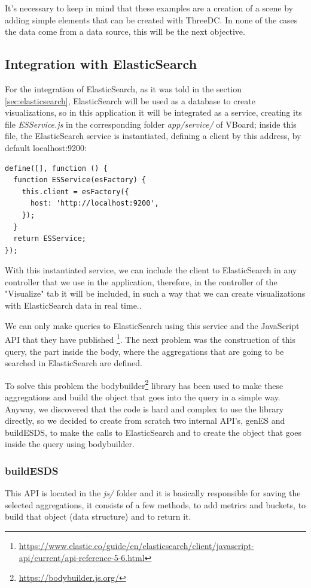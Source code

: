 \documentclass[a4paper, 12pt]{book}
\begin{document}
It's necessary to keep in mind that these examples are a creation of a scene by adding simple elements that can be created with ThreeDC. In none of the cases the data come from a data source, this will be the next objective.

\subsection{Integration with ElasticSearch}

For the integration of ElasticSearch, as it was told in the section \ref{sec:elasticsearch}, ElasticSearch will be used as a database to create visualizations, so in this application it will be integrated as a service, creating its file \textit{ESService.js} in the corresponding folder \textit{app/service/} of VBoard; inside this file, the ElasticSearch service is instantiated, defining a client by this address, by default localhost:9200:

\begin{lstlisting}[frame=single]
define([], function () {
  function ESService(esFactory) {
    this.client = esFactory({
      host: 'http://localhost:9200',
    });
  }
  return ESService;
});
\end{lstlisting}

With this instantiated service, we can include the client to ElasticSearch in any controller that we use in the application, therefore, in the controller of the "Visualize" tab it will be included, in such a way that we can create visualizations with ElasticSearch data in real time..

We can only make queries to ElasticSearch using this service and the JavaScript API that they have published \footnote{\url{https://www.elastic.co/guide/en/elasticsearch/client/javascript-api/current/api-reference-5-6.html}}. The next problem was the construction of this query, the part inside the body, where the aggregations that are going to be searched in ElasticSearch are defined.

To solve this problem the bodybuilder\footnote{\url{https://bodybuilder.js.org/}} library has been used to make these aggregations and build the object that goes into the query in a simple way. Anyway, we discovered that the code is hard and complex to use the library directly, so we decided to create from scratch two internal API's, genES and buildESDS, to make the calls to ElasticSearch and to create the object that goes inside the query using bodybuilder.

\subsubsection{buildESDS}
This API is located in the \textit{js/} folder and it is basically responsible for saving the selected aggregations, it consists of a few methods, to add metrics and buckets, to build that object (data structure) and to return it.
\end{document}
